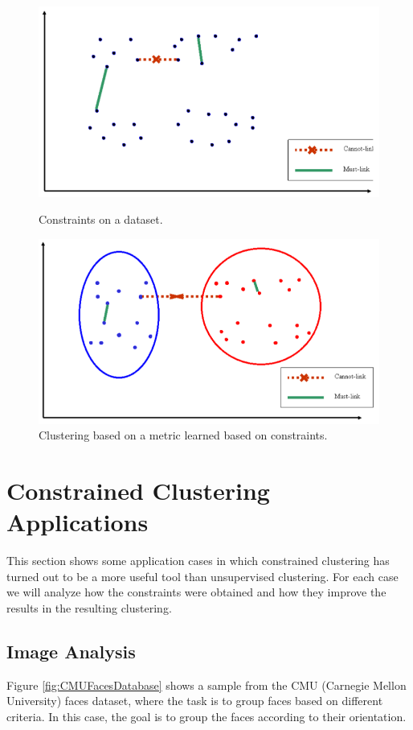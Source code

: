 \begin{figure}[bth]
	\myfloatalign
	{\includegraphics[width=.6\linewidth]{gfx/ConstClust/InputInstancesAndConst2}
	\caption[Constraints on a dataset.]{Constraints on a dataset. \cite{davidson2007survey}} \label{fig:ConstOverDataset2}
	}
	{\includegraphics[width=.6\linewidth]{gfx/ConstClust/MetricaAprendida}
	\caption[Clustering based on a metric learned based on constraints.]{Clustering based on a metric learned based on constraints. \cite{davidson2007survey}} \label{fig:MetricLearned}
	}
\end{figure}

\section{Constrained Clustering Applications} \label{sec:CCApplications}

This section shows some application cases in which constrained clustering has turned out to be a more useful tool than unsupervised clustering. For each case we will analyze how the constraints were obtained and how they improve the results in the resulting clustering. 

\subsection{Image Analysis}

Figure \ref{fig:CMUFacesDatabase} shows a sample from the CMU (Carnegie Mellon University) faces dataset, where the task is to group faces based on different criteria. In this case, the goal is to group the faces according to their orientation.

